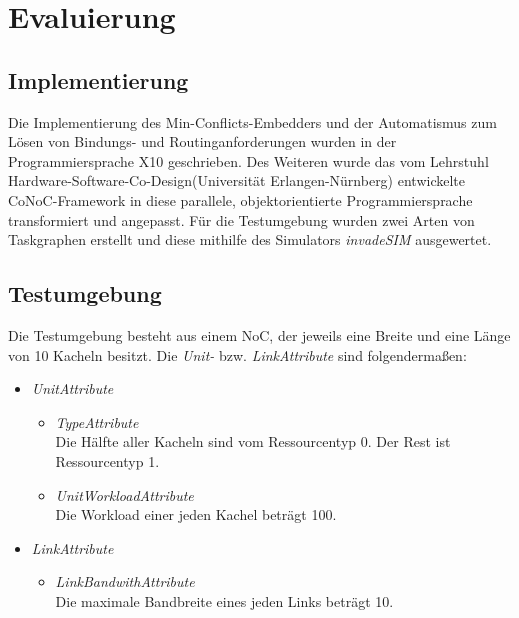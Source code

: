 \chapter{Evaluierung}\label{evaluierung}

\section{Implementierung} \label{Tests}
Die Implementierung des Min-Conflicts-Embedders und der Automatismus zum Lösen von Bindungs- und Routinganforderungen wurden in der Programmiersprache X10 \cite{x10} geschrieben. Des Weiteren wurde das vom Lehrstuhl \grqq Hardware-Software-Co-Design\grqq (Universität Erlangen-Nürnberg) entwickelte CoNoC-Framework in diese parallele, objektorientierte Programmiersprache transformiert und angepasst. Für die Testumgebung wurden zwei Arten von Taskgraphen erstellt und diese mithilfe des Simulators \textit{invadeSIM} \cite{invadeSIM}  ausgewertet.





\section{Testumgebung} \label{Testumgebung1} 
Die Testumgebung besteht aus einem NoC, der jeweils eine Breite und eine Länge von 10 Kacheln besitzt. Die \textit{Unit-} bzw. \textit{LinkAttribute} sind folgendermaßen:
\\
\begin{itemize}
\item \textit{UnitAttribute}
\begin{itemize}
\item \textit{TypeAttribute}\\
Die Hälfte aller Kacheln sind vom Ressourcentyp 0. Der Rest ist Ressourcentyp 1.
\item \textit{UnitWorkloadAttribute}\\
Die Workload einer jeden Kachel beträgt 100.

\end{itemize}
\item \textit{LinkAttribute}
\begin{itemize}
\item \textit{LinkBandwithAttribute}\\
Die maximale Bandbreite eines jeden Links beträgt 10.
\end{itemize}
\end{itemize}

